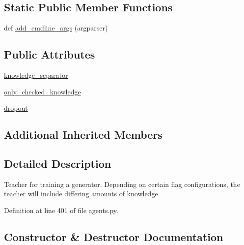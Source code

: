 \subsection*{Static Public Member Functions}
\begin{DoxyCompactItemize}
\item 
def \hyperlink{classparlai_1_1tasks_1_1wizard__of__wikipedia_1_1agents_1_1GeneratorTeacher_ae23cc01ce296734fbb1d23d8cb3ca81f}{add\+\_\+cmdline\+\_\+args} (argparser)
\end{DoxyCompactItemize}
\subsection*{Public Attributes}
\begin{DoxyCompactItemize}
\item 
\hyperlink{classparlai_1_1tasks_1_1wizard__of__wikipedia_1_1agents_1_1GeneratorTeacher_a4447c8875dd9f65e3d17ba2aec12d616}{knowledge\+\_\+separator}
\item 
\hyperlink{classparlai_1_1tasks_1_1wizard__of__wikipedia_1_1agents_1_1GeneratorTeacher_aafed07e065901daac67457e406e5dec0}{only\+\_\+checked\+\_\+knowledge}
\item 
\hyperlink{classparlai_1_1tasks_1_1wizard__of__wikipedia_1_1agents_1_1GeneratorTeacher_ab274137e75e9f6c5018376b4c61cdd32}{dropout}
\end{DoxyCompactItemize}
\subsection*{Additional Inherited Members}


\subsection{Detailed Description}
\begin{DoxyVerb}Teacher for training a generator. Depending on certain flag
configurations, the teacher will include differing amounts of knowledge\end{DoxyVerb}
 

Definition at line 401 of file agents.\+py.



\subsection{Constructor \& Destructor Documentation}
\mbox{\label{classparlai_1_1tasks_1_1wizard__of__wikipedia_1_1agents_1_1GeneratorTeacher_aebced34e7b98c204d1215e5898d16c8a}} 
